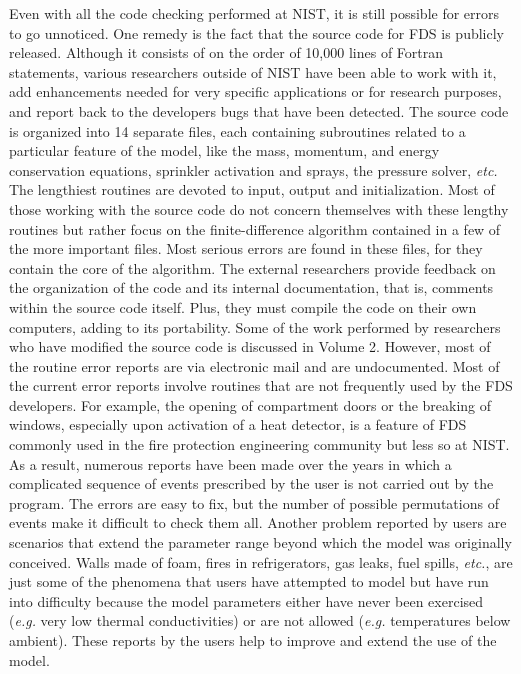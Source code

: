 \documentclass[11pt]{book}
\begin{document}
Even with all the code checking performed at NIST, it is still
possible for errors to go unnoticed. One remedy is the fact that the
source code for FDS is publicly released. Although it consists of on
the order of 10,000 lines of Fortran statements, various researchers
outside of NIST have been able to work with it, add enhancements
needed for very specific applications or for research purposes, and
report back to the developers bugs that have been detected. The source
code is organized into 14 separate files, each containing subroutines
related to a particular feature of the model, like the mass, momentum,
and energy conservation equations, sprinkler activation and sprays,
the pressure solver, {\em etc.} The lengthiest routines are devoted to
input, output and initialization.  Most of those working with the
source code do not concern themselves with these lengthy routines but
rather focus on the finite-difference algorithm contained in a few of
the more important files. Most serious errors are found in these
files, for they contain the core of the algorithm. The external
researchers provide feedback on the organization of the code and its
internal documentation, that is, comments within the source code
itself.  Plus, they must compile the code on their own computers,
adding to its portability. Some of the work performed by researchers
who have modified the source code is discussed in Volume 2.  However, most of the routine
error reports are via electronic mail and are undocumented.  Most of
the current error reports involve routines that are not frequently
used by the FDS developers.  For example, the opening of compartment
doors or the breaking of windows, especially upon activation of a heat
detector, is a feature of FDS commonly used in the fire protection
engineering community but less so at NIST. As a result, numerous
reports have been made over the years in which a complicated sequence
of events prescribed by the user is not carried out by the program.
The errors are easy to fix, but the number of possible permutations of
events make it difficult to check them all. Another problem reported
by users are scenarios that extend the parameter range beyond which
the model was originally conceived.  Walls made of foam, fires in
refrigerators, gas leaks, fuel spills, {\em etc.}, are just some of
the phenomena that users have attempted to model but have run into
difficulty because the model parameters either have never been
exercised ({\em e.g.} very low thermal conductivities) or are not
allowed ({\em e.g.} temperatures below ambient). These reports by the
users help to improve and extend the use of the model.
\end{document}
